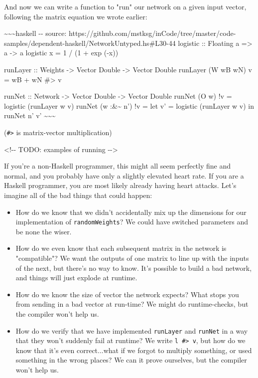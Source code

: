 \documentclass[]{article}
\begin{document}
And now we can write a function to "run" our network on a given input vector,
following the matrix equation we wrote earlier:

\textasciitilde{}\textasciitilde{}\textasciitilde{}haskell -\/- source:
https://github.com/mstksg/inCode/tree/master/code-samples/dependent-haskell/NetworkUntyped.hs\#L30-44
logistic :: Floating a =\textgreater{} a -\textgreater{} a logistic x = 1 / (1 +
exp (-x))

runLayer :: Weights -\textgreater{} Vector Double -\textgreater{} Vector Double
runLayer (W wB wN) v = wB + wN \#\textgreater{} v

runNet :: Network -\textgreater{} Vector Double -\textgreater{} Vector Double
runNet (O w) !v = logistic (runLayer w v) runNet (w :\&\textasciitilde{} n') !v
= let v' = logistic (runLayer w v) in runNet n' v'
\textasciitilde{}\textasciitilde{}\textasciitilde{}

(\texttt{\#\textgreater{}} is matrix-vector multiplication)

\textless{}!-\/- TODO: examples of running -\/-\textgreater{}

If you're a non-Haskell programmer, this might all seem perfectly fine and
normal, and you probably have only a slightly elevated heart rate. If you are a
Haskell programmer, you are most likely already having heart attacks. Let's
imagine all of the bad things that could happen:

\begin{itemize}
\item
  How do we know that we didn't accidentally mix up the dimensions for our
  implementation of \texttt{randomWeights}? We could have switched parameters
  and be none the wiser.
\item
  How do we even know that each subsequent matrix in the network is
  "compatible"? We want the outputs of one matrix to line up with the inputs of
  the next, but there's no way to know. It's possible to build a bad network,
  and things will just explode at runtime.
\item
  How do we know the size of vector the network expects? What stops you from
  sending in a bad vector at run-time? We might do runtime-checks, but the
  compiler won't help us.
\item
  How do we verify that we have implemented \texttt{runLayer} and
  \texttt{runNet} in a way that they won't suddenly fail at runtime? We write
  \texttt{l\ \#\textgreater{}\ v}, but how do we know that it's even
  correct...what if we forgot to multiply something, or used something in the
  wrong places? We can it prove ourselves, but the compiler won't help us.
\end{itemize}
\end{document}
